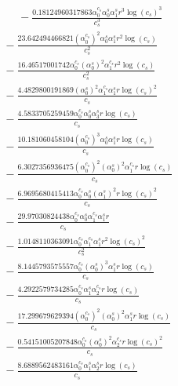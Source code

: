 \documentclass[10pt]{article}
\begin{document}
\begin{align*}
\phantom{R_{2,7}} &\phantom{={}}{}  - \frac{0.18124960317863 \alpha_{0}^{c_s} \alpha_{0}^s \alpha_{1}^s r^{3} \log{\left(c_{s} \right)}^{3}}{c_{s}^{3}} \\
&{}  - \frac{23.642494466821 \left(\alpha_{0}^{c_s}\right)^{2} \alpha_{0}^s \alpha_{1}^s r^{2} \log{\left(c_{s} \right)}}{c_{s}^{2}} \\
&{}  - \frac{16.46517001742 \alpha_{0}^{c_s} \left(\alpha_{0}^s\right)^{2} \alpha_{1}^{c_s} r^{2} \log{\left(c_{s} \right)}}{c_{s}^{2}} \\
&{}  - \frac{4.4829800191869 \left(\alpha_{0}^s\right)^{2} \alpha_{1}^{c_s} \alpha_{1}^s r \log{\left(c_{s} \right)}^{2}}{c_{s}} \\
&{}  - \frac{4.5833705259459 \alpha_{0}^{c_s} \alpha_{0}^s \alpha_{3}^s r \log{\left(c_{s} \right)}}{c_{s}} \\
&{}  - \frac{10.181060458104 \left(\alpha_{0}^{c_s}\right)^{3} \alpha_{0}^s \alpha_{1}^s r \log{\left(c_{s} \right)}}{c_{s}} \\
&{}  - \frac{6.3027356936475 \left(\alpha_{0}^{c_s}\right)^{2} \left(\alpha_{0}^s\right)^{2} \alpha_{1}^{c_s} r \log{\left(c_{s} \right)}}{c_{s}} \\
&{}  - \frac{6.9695680415413 \alpha_{0}^{c_s} \alpha_{0}^s \left(\alpha_{1}^s\right)^{2} r \log{\left(c_{s} \right)}^{2}}{c_{s}} \\
&{}  - \frac{29.97030824438 \alpha_{0}^{c_s} \alpha_{0}^s \alpha_{1}^{c_s} \alpha_{1}^s r}{c_{s}} \\
&{}  - \frac{1.0148110363091 \alpha_{0}^{c_s} \alpha_{1}^{c_s} \alpha_{1}^s r^{2} \log{\left(c_{s} \right)}^{2}}{c_{s}^{2}} \\
&{}  - \frac{8.1445793575557 \alpha_{0}^{c_s} \left(\alpha_{0}^s\right)^{3} \alpha_{1}^s r \log{\left(c_{s} \right)}}{c_{s}} \\
&{}  - \frac{4.2922579734285 \alpha_{0}^{c_s} \alpha_{1}^s \alpha_{2}^{c_s} r \log{\left(c_{s} \right)}}{c_{s}} \\
&{}  - \frac{17.299679629394 \left(\alpha_{0}^{c_s}\right)^{2} \left(\alpha_{0}^s\right)^{2} \alpha_{1}^s r \log{\left(c_{s} \right)}}{c_{s}} \\
&{}  - \frac{0.54151005207848 \alpha_{0}^{c_s} \left(\alpha_{0}^s\right)^{2} \alpha_{2}^{c_s} r \log{\left(c_{s} \right)}^{2}}{c_{s}} \\
&{}  - \frac{8.6889562483161 \alpha_{0}^{c_s} \alpha_{1}^s \alpha_{2}^s r \log{\left(c_{s} \right)}}{c_{s}} \\

\end{align*}
\end{document}
